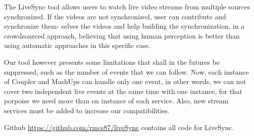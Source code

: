 The LiveSync tool allows users to watch live video streams from multiple sources synchronized. If the videos are not synchronized, user can contribute and synchronize them- selves the videos and help building the synchronization, in a crowdsourced approach, believing that using human perception is better than using automatic approaches in this specific case.

Our tool however presents some limitations that shall in the futures be suppressed, such as the number of events that we can follow. Now, each instance of Coupler and MashUps can handle only one event, in other words, we can not cover two independent live events at the same time with one instance, for that porpoise we need more than on instance of each service. Also, new stream services must be added to increase our compatibilities.

Github \url{https://github.com/rmcs87/liveSync} contains all code for LiveSync.